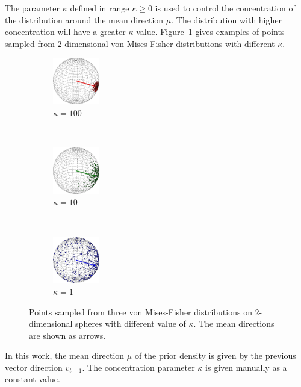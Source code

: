 The parameter $\kappa$ defined in range $\kappa \ge 0$ is used to control the concentration of the distribution around the mean direction $\mu$. The distribution with higher concentration will have a greater $\kappa$ value. Figure~\ref{fisher} gives examples of points sampled from 2-dimensional von Mises-Fisher distributions with different $\kappa$.

\begin{figure}[htb]
  \centering
  \begin{subfigure}[b]{0.16\textwidth}
    \centering
    \includegraphics[width=0.8in]{../figures/vf_100.eps}
    \caption{$\kappa=100$}
  \end{subfigure}~
  \begin{subfigure}[b]{0.16\textwidth}
    \centering
    \includegraphics[width=0.8in]{../figures/vf_10.eps}
    \caption{$\kappa=10$}
  \end{subfigure}~
  \begin{subfigure}[b]{0.16\textwidth}
    \centering
    \includegraphics[width=0.8in]{../figures/vf_1.eps}
    \caption{$\kappa=1$}
  \end{subfigure}
  \caption{Points sampled from three von Mises-Fisher distributions on $2$-dimensional spheres with different value of $\kappa$. The mean directions are shown as arrows.}
  \label{fisher}
\end{figure}

In this work, the mean direction $\mu$ of the prior density is given by the previous vector direction ${v_{t - 1}}$. The concentration parameter $\kappa$ is given manually as a constant value.

